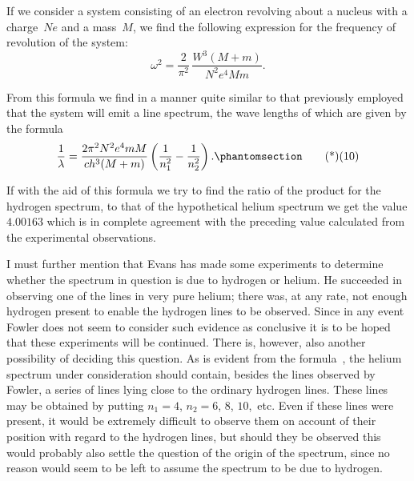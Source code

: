 If we consider a system consisting of an electron revolving about
a nucleus with a charge~$Ne$ and a mass~$M$, we find the following
expression for the frequency of revolution of the system:
\[
\omega^{2} = \frac{2}{\pi^{2}}\, \frac{W^{3} (M + m)}{N^{2} e^{4} Mm}.
\]

From this formula we find in a manner quite similar to that
previously employed that the system will emit a line spectrum,
the wave lengths of which are given by the formula
\[
\frac{1}{\lambda}
  = \frac{2\pi^{2} N^{2} e^{4} mM}{ch^{3} (M + m)}
  \left(\frac{1}{n_{1}^{2}} - \frac{1}{n_{2}^{2}}\right).
\Tag{(10)}
\]

If with the aid of this formula we try to find the ratio of the
product for the hydrogen spectrum, to that of the hypothetical
helium spectrum we get the value $4.00163$ which is in complete
agreement with the preceding value calculated from the experimental
observations.

I must further mention that Evans has made some experiments
to determine whether the spectrum in question is due to hydrogen
or helium. He succeeded in observing one of the lines in very
pure helium; there was, at any rate, not enough hydrogen present
to enable the hydrogen lines to be observed. Since in any event
Fowler does not seem to consider such evidence as conclusive it is
to be hoped that these experiments will be continued. There is,
however, also another possibility of deciding this question. As is
evident from the formula~, the helium spectrum under consideration
should contain, besides the lines observed by Fowler, a
series of lines lying close to the ordinary hydrogen lines. These
lines may be obtained by putting $n_{1} = 4$, $n_{2} = 6$, $8$, $10$,~etc. Even
if these lines were present, it would be extremely difficult to
observe them on account of their position with regard to the
hydrogen lines, but should they be observed this would probably
also settle the question of the origin of the spectrum, since no
reason would seem to be left to assume the spectrum to be due to
hydrogen.

